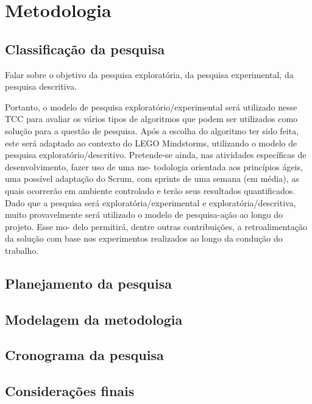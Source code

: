 \chapter{Metodologia}
\section{Classificação da pesquisa}

Falar sobre o objetivo da pesquisa exploratória, da pesquisa experimental, da pesquisa descritiva. 

Portanto, o modelo de pesquisa exploratório/experimental será utilizado nesse
TCC para avaliar os vários tipos de algoritmos que podem ser utilizados como solução para
a questão de pesquisa. Após a escolha do algoritmo ter sido feita, este será adaptado ao
contexto do LEGO Mindstorms, utilizando o modelo de pesquisa exploratório/descritivo.
Pretende-se ainda, nas atividades específicas de desenvolvimento, fazer uso de uma me-
todologia orientada aos princípios ágeis, uma possível adaptação do Scrum, com sprints
de uma semana (em média), as quais ocorrerão em ambiente controlado e terão seus
resultados quantificados.
Dado que a pesquisa será exploratória/experimental e exploratória/descritiva, muito
provavelmente será utilizado o modelo de pesquisa-ação ao longo do projeto. Esse mo-
delo permitirá, dentre outras contribuições, a retroalimentação da solução com base nos
experimentos realizados ao longo da condução do trabalho.

\section{Planejamento da pesquisa}
\section{Modelagem da metodologia}
\section{Cronograma da pesquisa}
\section{Considerações finais}